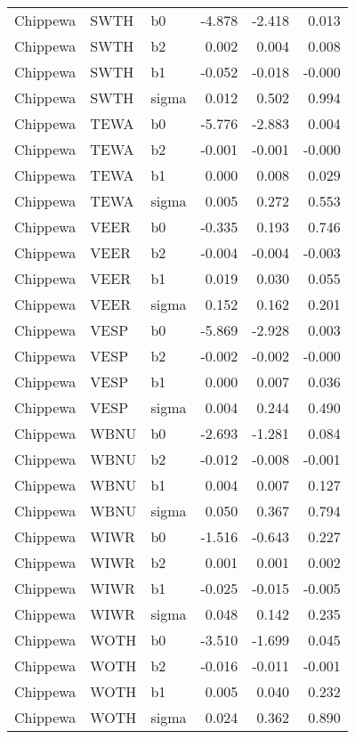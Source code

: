 \begin{table}[ht]
\begin{center}
\begin{tabular}{lllrrr}
  Chippewa & SWTH & b0 & -4.878 & -2.418 & 0.013 \\ 
  Chippewa & SWTH & b2 & 0.002 & 0.004 & 0.008 \\ 
  Chippewa & SWTH & b1 & -0.052 & -0.018 & -0.000 \\ 
  Chippewa & SWTH & sigma & 0.012 & 0.502 & 0.994 \\ 
  Chippewa & TEWA & b0 & -5.776 & -2.883 & 0.004 \\ 
  Chippewa & TEWA & b2 & -0.001 & -0.001 & -0.000 \\ 
  Chippewa & TEWA & b1 & 0.000 & 0.008 & 0.029 \\ 
  Chippewa & TEWA & sigma & 0.005 & 0.272 & 0.553 \\ 
  Chippewa & VEER & b0 & -0.335 & 0.193 & 0.746 \\ 
  Chippewa & VEER & b2 & -0.004 & -0.004 & -0.003 \\ 
  Chippewa & VEER & b1 & 0.019 & 0.030 & 0.055 \\ 
  Chippewa & VEER & sigma & 0.152 & 0.162 & 0.201 \\ 
  Chippewa & VESP & b0 & -5.869 & -2.928 & 0.003 \\ 
  Chippewa & VESP & b2 & -0.002 & -0.002 & -0.000 \\ 
  Chippewa & VESP & b1 & 0.000 & 0.007 & 0.036 \\ 
  Chippewa & VESP & sigma & 0.004 & 0.244 & 0.490 \\ 
  Chippewa & WBNU & b0 & -2.693 & -1.281 & 0.084 \\ 
  Chippewa & WBNU & b2 & -0.012 & -0.008 & -0.001 \\ 
  Chippewa & WBNU & b1 & 0.004 & 0.007 & 0.127 \\ 
  Chippewa & WBNU & sigma & 0.050 & 0.367 & 0.794 \\ 
  Chippewa & WIWR & b0 & -1.516 & -0.643 & 0.227 \\ 
  Chippewa & WIWR & b2 & 0.001 & 0.001 & 0.002 \\ 
  Chippewa & WIWR & b1 & -0.025 & -0.015 & -0.005 \\ 
  Chippewa & WIWR & sigma & 0.048 & 0.142 & 0.235 \\ 
  Chippewa & WOTH & b0 & -3.510 & -1.699 & 0.045 \\ 
  Chippewa & WOTH & b2 & -0.016 & -0.011 & -0.001 \\ 
  Chippewa & WOTH & b1 & 0.005 & 0.040 & 0.232 \\ 
  Chippewa & WOTH & sigma & 0.024 & 0.362 & 0.890 \\ 

\end{tabular}
\end{center}
\end{table}
